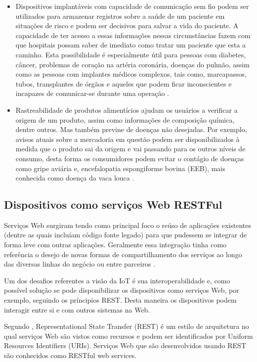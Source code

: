 \begin{itemize}
\item Dispositivos implantáveis com capacidade de comunicação sem fio podem ser utilizados para armazenar registros sobre a saúde de um paciente em situações de risco e podem ser decisivos para salvar a vida do paciente. A capacidade de ter acesso a essas informações nessas circunstâncias fazem com que hospitais possam saber de imediato como tratar um paciente que esta a caminho. Esta possibilidade é especialmente útil para pessoas com diabetes, câncer, problemas de coração na artéria coronária, doenças do pulmão, assim como as pessoas com implantes médicos complexos, tais como, marcapassos, tubos, transplantes de órgãos e aqueles que podem ficar inconscientes e incapazes de comunicar-se durante uma operação \cite{Weber:2010}.
\item Rastreabilidade de produtos alimentícios ajudam os usuários a verificar a origem de um produto, assim como informações de composição química, dentre outros. Mas também previne de doenças não desejadas. Por exemplo, avisos atuais sobre a mercadoria em questão podem ser disponibilizados à medida que o produto sai da origem e vai passando para os outros níveis de consumo, desta forma os consumidores podem evitar o contágio de doenças como gripe aviária e, encefalopatia espongiforme bovina (EEB), mais conhecida como doença da vaca louca \cite{Weber:2010}.
\end{itemize}

\subsection{Dispositivos como serviços Web RESTFul} 
\label{subsec:dispositivosWeb}
Serviços Web surgiram tendo como principal foco o reúso de aplicações existentes (dentre as quais incluíam código fonte legado) para que pudessem se integrar de forma leve com outras aplicações. Geralmente essa integração tinha como referência o desejo de  novas formas de compartilhamento dos serviços ao longo das diversas linhas do negócio ou entre parceiros \cite{Papazoglou:2008}.

Um dos desafios referentes a visão da IoT é sua interoperabilidade e, como possível solução se pode disponibilizar os dispositivos como serviços Web, por exemplo, seguindo os príncipios REST. Desta maneira os dispositivos podem interagir entre si e com outros sistemas na Web.

Segundo \cite{Heffelfinger:2014}, Representational State Transfer (REST) é um estilo de arquitetura no qual serviços Web são vistos como recursos e podem ser identificados por Uniform Resources Identifiers (URIs). Serviços Web que são desenvolvidos usando REST são conhecidos como RESTful web services. 

